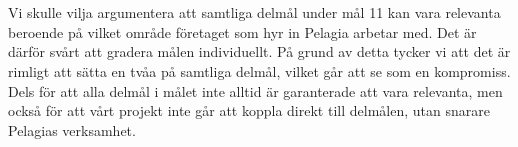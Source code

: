 \\
\\
Vi skulle vilja argumentera att samtliga delmål under mål 11 kan vara relevanta beroende på vilket område företaget som hyr in Pelagia arbetar med. Det är därför svårt att gradera målen individuellt. På grund av detta tycker vi att det är rimligt att sätta en tvåa på samtliga delmål, vilket går att se som en kompromiss. Dels för att alla delmål i målet inte alltid är garanterade att vara relevanta, men också för att vårt projekt inte går att koppla direkt till delmålen, utan snarare Pelagias verksamhet.